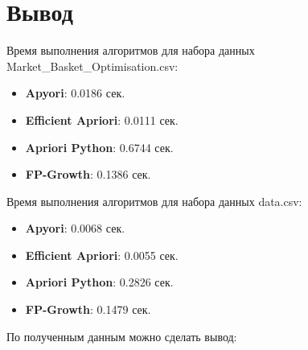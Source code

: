 \documentclass[14pt,a4paper,oneside]{extarticle}
\providecommand{\tightlist}{%
      \setlength{\itemsep}{0pt}\setlength{\parskip}{0pt}}
\begin{document}
\clearpage

    \hypertarget{ux432ux44bux432ux43eux434}{%
\section*{\Large Вывод}\label{ux432ux44bux432ux43eux434}}

Время выполнения алгоритмов
для набора данных Market\_Basket\_Optimisation.csv:

\begin{itemize}
\tightlist
\item
  \textbf{Apyori}: 0.0186 сек.
\item
  \textbf{Efficient Apriori}: 0.0111 сек.
\item
  \textbf{Apriori Python}: 0.6744 сек.
\item
  \textbf{FP-Growth}: 0.1386 сек.
\end{itemize}

Время выполнения алгоритмов для набора данных data.csv:

\begin{itemize}
\tightlist
\item
  \textbf{Apyori}: 0.0068 сек.
\item
  \textbf{Efficient Apriori}: 0.0055 сек.
\item
  \textbf{Apriori Python}: 0.2826 сек.
\item
  \textbf{FP-Growth}: 0.1479 сек.
\end{itemize}

По полученным данным можно сделать вывод:
\end{document}
